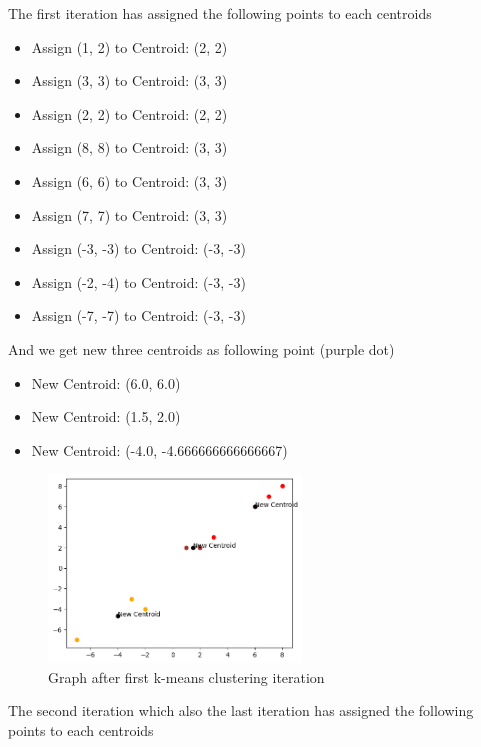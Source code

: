 \documentclass[12pt, a4paper]{article}
\begin{document}
The first iteration has assigned the following points to each centroids

\begin{itemize}
    \item Assign (1, 2) to Centroid: (2, 2)
    \item Assign (3, 3) to Centroid: (3, 3)
    \item Assign (2, 2) to Centroid: (2, 2)
    \item Assign (8, 8) to Centroid: (3, 3)
    \item Assign (6, 6) to Centroid: (3, 3)
    \item Assign (7, 7) to Centroid: (3, 3)
    \item Assign (-3, -3) to Centroid: (-3, -3)
    \item Assign (-2, -4) to Centroid: (-3, -3)
    \item Assign (-7, -7) to Centroid: (-3, -3)
\end{itemize}

And we get new three centroids as following point (purple dot)

\begin{itemize}
    \item New Centroid: (6.0, 6.0)
    \item New Centroid: (1.5, 2.0)
    \item New Centroid: (-4.0, -4.666666666666667)
\end{itemize}

\clearpage

\begin{figure}[ht]
    \centering
    \includegraphics[width=0.6\textwidth]{images/T5_first_iteration.png}
    \caption{Graph after first k-means clustering iteration}
\end{figure}

The second iteration which also the last iteration has assigned the following points to each centroids
\end{document}
